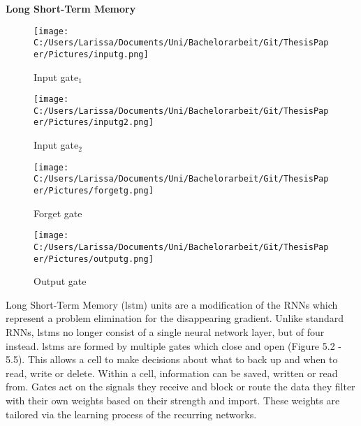 \documentclass[a4paper, 11pt,titlepage,oneside,openany]{book}
\begin{document}
\noindent \textbf{Long Short-Term Memory} \\
\begin{figure}[h]
	\begin{minipage}[b]{0.4\linewidth}
		\texttt{[image: C:/Users/Larissa/Documents/Uni/Bachelorarbeit/Git/ThesisPaper/Pictures/inputg.png]}
		\caption{Input gate$_1$ \cite{rnn}}
	\end{minipage}
	\hfill
	\begin{minipage}[b]{0.4\linewidth}
		\texttt{[image: C:/Users/Larissa/Documents/Uni/Bachelorarbeit/Git/ThesisPaper/Pictures/inputg2.png]}
		\caption{Input gate$_2$ \cite{rnn}}
	\end{minipage}
	\begin{minipage}[b]{0.4\linewidth}
		\texttt{[image: C:/Users/Larissa/Documents/Uni/Bachelorarbeit/Git/ThesisPaper/Pictures/forgetg.png]}
		\caption{Forget gate \cite{rnn}}
	\end{minipage}
	\hfill
	\begin{minipage}[b]{0.4\linewidth}
		\texttt{[image: C:/Users/Larissa/Documents/Uni/Bachelorarbeit/Git/ThesisPaper/Pictures/outputg.png]}
		\caption{Output gate \cite{rnn}}
	\end{minipage}
\end{figure}
Long Short-Term Memory (\gls{lstm}) units \cite{lstm} are a modification of the RNNs which represent a problem elimination for the disappearing gradient. Unlike standard RNNs, \gls{lstm}s no longer consist of a single neural network layer, but of four instead. \gls{lstm}s are formed by multiple gates which close and open (Figure 5.2 - 5.5). This allows a cell to make decisions about what to back up and when to read, write or delete. Within a cell, information can be saved, written or read from. Gates act on the signals they receive and block or route the data they filter with their own weights based on their strength and import. These weights are tailored via the learning process of the recurring networks. 
\end{document}

